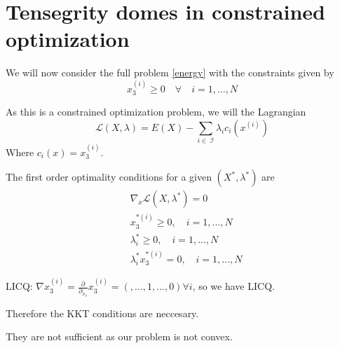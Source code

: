 \section{Tensegrity domes in constrained optimization}
We will now consider the full problem \eqref{energy} with the constraints given by 
\begin{equation}
    x_3^{(i)} \geq 0 \quad \forall \quad i = 1,...,N
\end{equation}

As this is a constrained optimization problem, we will the Lagrangian \begin{equation}
    \mathcal{L}(X,\lambda) = E(X) - \sum_{i \in \ \mathcal{I}}\lambda_i c_i(x^{(i)})
\end{equation}
Where $c_i(x) = x^{(i)}_3$.

The first order optimality conditions for a given $(X^*,\lambda^*)$ are \begin{equation}
\begin{aligned}
       &\nabla_x \mathcal{L}(X,\lambda^*)=0\\ 
       &x^{*(i)}_3 \geq 0,\quad i = 1,...,N\\
       &\lambda_i^* \geq 0 ,\quad i = 1,...,N\\
       & \lambda_i^* x^{*(i)}_3 = 0,\quad i = 1,...,N
\end{aligned}
\end{equation}

LICQ: $\nabla x_3^{(i)} = \frac{\partial}{\partial_{x_3}} x_3^{(i)} =(,..., 1,...,0) \forall i$, so we have LICQ.

Therefore the KKT conditions are neccesary.

They are not sufficient as our problem is not convex.